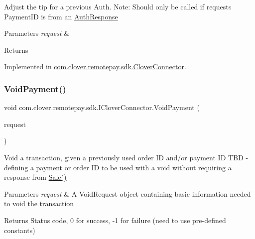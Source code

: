 Adjust the tip for a previous Auth. Note\+: Should only be called if request\textquotesingle{}s Payment\+ID is from an \hyperlink{classcom_1_1clover_1_1remotepay_1_1sdk_1_1_auth_response}{Auth\+Response} 


\begin{DoxyParams}{Parameters}
{\em request} & \\
\hline
\end{DoxyParams}
\begin{DoxyReturn}{Returns}

\end{DoxyReturn}


Implemented in \hyperlink{classcom_1_1clover_1_1remotepay_1_1sdk_1_1_clover_connector_a84fa27d8c605594999b39e619b20359e}{com.\+clover.\+remotepay.\+sdk.\+Clover\+Connector}.

\mbox{\label{interfacecom_1_1clover_1_1remotepay_1_1sdk_1_1_i_clover_connector_af35e223ba760d0a6d61c67895c619997}} 
\subsubsection{\texorpdfstring{Void\+Payment()}{VoidPayment()}}
{\footnotesize\ttfamily void com.\+clover.\+remotepay.\+sdk.\+I\+Clover\+Connector.\+Void\+Payment (\begin{DoxyParamCaption}\item[{\hyperlink{classcom_1_1clover_1_1remotepay_1_1sdk_1_1_void_payment_request}{Void\+Payment\+Request}}]{request }\end{DoxyParamCaption})}



Void a transaction, given a previously used order ID and/or payment ID T\+BD -\/ defining a payment or order ID to be used with a void without requiring a response from \hyperlink{interfacecom_1_1clover_1_1remotepay_1_1sdk_1_1_i_clover_connector_acc92394e6902137c559510e498e78529}{Sale()} 


\begin{DoxyParams}{Parameters}
{\em request} & A Void\+Request object containing basic information needed to void the transaction\\
\hline
\end{DoxyParams}
\begin{DoxyReturn}{Returns}
Status code, 0 for success, -\/1 for failure (need to use pre-\/defined constants)
\end{DoxyReturn}


